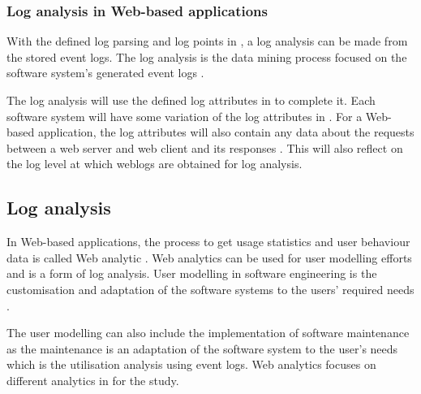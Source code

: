 \subsubsection{Log analysis in Web-based applications}
With the defined log parsing and log points in , a log analysis can be made from the stored event logs. The log analysis is the data mining process focused on the software system's generated event logs \cite{Slaninova2014,Hasiloglu2018}.\par The log analysis will use the defined log attributes in  to complete it. Each software system will have some variation of the log attributes in . For a Web-based application, the log attributes will also contain any data about the requests between a web server and web client and its responses \cite{Slaninova2014, Dhanalakshmi2016}. This will also reflect on the log level at which weblogs are obtained for log analysis.


\subsection{Log analysis}\label{sec:ch1_systemUtilisation}
In Web-based applications, the process to get usage statistics and user behaviour data is called Web analytic \cite{Kocsis2012}. Web analytics can be used for user modelling efforts and is a form of log analysis. User modelling in software engineering is the customisation and adaptation of the software systems to the users' required needs \cite{Waqar2017, Paliouras1999}.\par The user modelling can also include the implementation of software maintenance as the maintenance is an adaptation of the software system to the user's needs which is the utilisation analysis using event logs. Web analytics focuses on different analytics in  for the study. 

